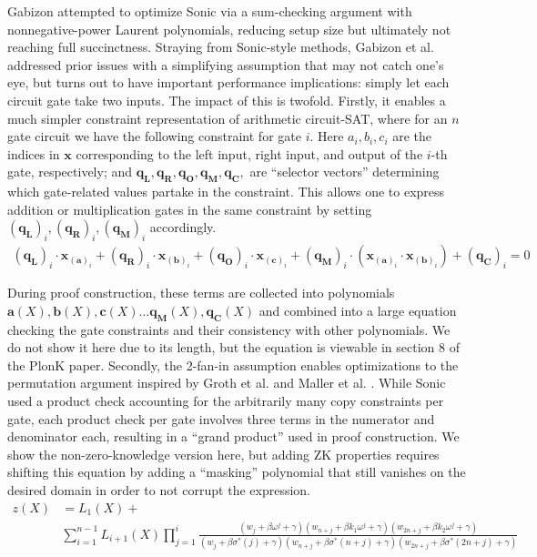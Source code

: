 \noindent Gabizon \cite{auroralight} attempted to optimize Sonic via a sum-checking argument with nonnegative-power Laurent polynomials, reducing setup size but ultimately not reaching full succinctness. Straying from Sonic-style methods, Gabizon et al. \cite{plonk} addressed prior issues with a simplifying assumption that may not catch one's eye, but turns out to have important performance implications: simply let each circuit gate take two inputs. The impact of this is twofold. Firstly, it enables a much simpler constraint representation of arithmetic circuit-SAT, where for an $n$ gate circuit we have the following constraint for gate $i$. Here $a_i, b_i, c_i$ are the indices in $\mathbf{x}$ corresponding to the left input, right input, and output of the $i$-th gate, respectively; and $\mathbf{q_L}, \mathbf{q_R},\mathbf{q_O},\mathbf{q_M},\mathbf{q_C},$ are ``selector vectors'' determining which gate-related values partake in the constraint. This allows one to express addition or multiplication gates in the same constraint by setting $(\mathbf{q_L})_i, (\mathbf{q_R})_i, (\mathbf{q_M})_i$ accordingly. 
\begin{align}
(\mathbf{q_L})_i \cdot \mathbf{x}_{(\mathbf{a})_i} + (\mathbf{q_R})_i \cdot \mathbf{x}_{(\mathbf{b})_i} + (\mathbf{q_O})_i \cdot \mathbf{x}_{(\mathbf{c})_i} + (\mathbf{q_M})_i \cdot (\mathbf{x}_{(\mathbf{a})_i} \cdot \mathbf{x}_{(\mathbf{b})_i}) + (\mathbf{q_C})_i = 0
\end{align}


\noindent During proof construction, these terms are collected into polynomials $\mathbf{a}(X), \mathbf{b}(X), \mathbf{c}(X) \dots \mathbf{q_M}(X), \mathbf{q_C}(X)$ and combined into a large equation checking the gate constraints and their consistency with other polynomials. We do not show it here due to its length, but the equation is viewable in section 8 of the PlonK paper. Secondly, the 2-fan-in assumption enables optimizations to the permutation argument inspired by Groth et al. and Maller et al. \cite{grothshuffle, sonic}. While Sonic used a product check accounting for the arbitrarily many copy constraints per gate, each product check per gate involves three terms in the numerator and denominator each, resulting in a ``grand product'' used in proof construction. We show the non-zero-knowledge version here, but adding ZK properties requires shifting this equation by adding a ``masking'' polynomial that still vanishes on the desired domain in order to not corrupt the expression.
\begin{align}
    z(X) &= L_1(X) + \\
    &\sum_{i=1}^{n-1} L_{i+1}(X) \prod_{j=1}^{i} \frac{(w_j + \beta\omega^j + \gamma)(w_{n+j} + \beta k_1\omega^j + \gamma)(w_{2n+j} + \beta k_2\omega^j + \gamma)}{(w_j + \beta\sigma^*(j) + \gamma)(w_{n+j} + \beta\sigma^*(n+j) + \gamma)(w_{2n+j} + \beta\sigma^*(2n+j) + \gamma)}
\end{align}

